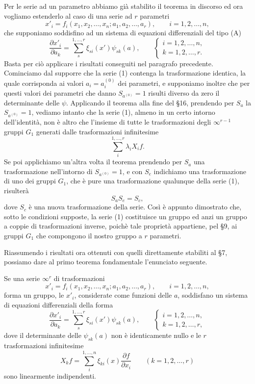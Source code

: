 \documentclass[11pt]{book}
\begin{document}
Per le serie ad un parametro abbiamo già stabilito il teorema in discorso ed ora vogliamo estenderlo al caso di una serie ad $r$ parametri
\begin{equation*}\tag{1}
 x'_i=f_i(x_1,x_2,\ldots,x_n; a_1,a_2,\ldots,a_r),\qquad i=1,2,\ldots,n,
\end{equation*}
che supponiamo soddisfino ad un sistema di equazioni differenziali del tipo (A)
\begin{equation*}\tag{A}
 \frac{\partial x'_i}{\partial a_k}=\sum\limits_s^{1,\ldots,r}\xi_{si}(x')\psi_{sk}(a),
 \qquad
 \begin{cases}
 i=1,2,\ldots,n,\\
 k=1,2,\ldots,r.
 \end{cases}
\end{equation*}
Basta per ciò applicare i risultati conseguiti nel paragrafo precedente. Cominciamo dal supporre che la serie (1) contenga la trasformazione identica, la quale corrisponda ai valori $a_i=a_i^{(0)}$ dei parametri, e supponiamo inoltre che per questi valori dei parametri che danno $S_{a^{(0)}}=1$ risulti diverso da zero il determinante delle $\psi$. Applicando il teorema alla fine del \S{}16, prendendo per $S_a$ la $S_{a^{(0)}}=1$, vediamo intanto che la serie (1), almeno in un certo intorno dell'identità, non è altro che l'insieme di tutte le trasformazioni degli $\infty^{r-1}$ gruppi $G_1$ generati dalle trasformazioni infinitesime
\[
 \sum\limits_i^{1,\ldots,r} \lambda_i X_i f.
\]
Se poi applichiamo un'altra volta il teorema prendendo per $S_a$ una trasformazione nell'intorno di $S_{a^{(0)}}=1$, e con $S_e$ indichiamo una trasformazione di uno dei gruppi $G_1$, che è pure una trasformazione qualunque della serie (1), risulterà
\[
 S_aS_e=S_c,
\]
dove $S_c$ è una nuova trasformazione della serie. Così è appunto dimostrato che, sotto le condizioni supposte, la serie (1) costituisce un gruppo ed anzi un gruppo a coppie di trasformazioni inverse, poichè tale proprietà appartiene, pel \S{}9, ai gruppi $G_1$ che compongono il nostro gruppo a $r$ parametri.

Riassumendo i risultati ora ottenuti con quelli direttamente stabiliti al \S{}7, possiamo dare al primo teorema fondamentale l'enunciato seguente.

Se una serie $\infty^r$ di trasformazioni
\[
 x'_i=f_i(x_1,x_2,\ldots,x_n; a_1,a_2,\ldots,a_r),\qquad i=1,2,\ldots,n,
\]
forma un gruppo, le $x'_i$, considerate come funzioni delle $a$, soddisfano un sistema di equazioni differenziali della forma
\begin{equation*}\tag{A}
 \frac{\partial x'_i}{\partial a_k}=\sum\limits_s^{1,\ldots,r}\xi_{si}(x')\psi_{sk}(a),
 \qquad
 \begin{cases}
 i=1,2,\ldots,n,\\
 k=1,2,\ldots,r,
 \end{cases}
\end{equation*}
dove il determinante delle $\psi_{sk}(a)$ non è identicamente nullo e le $r$ trasformazioni infinitesime
\[
 X_kf=\sum\limits_i^{1,\ldots,n} \xi_{ki}(x)\frac{\partial f}{\partial x_i}\qquad (k=1,2,\ldots,r)
\]
sono linearmente indipendenti.
\end{document}
